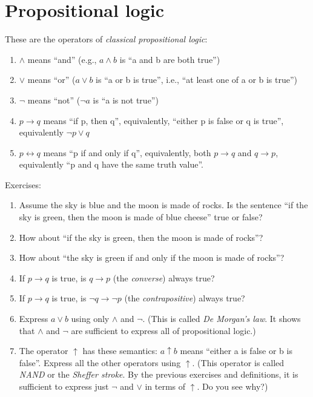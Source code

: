 \documentclass[letterpaper,12pt]{article}
\renewcommand{\implies}{\rightarrow}
\begin{document}
\section{Propositional logic}
These are the operators of \emph{classical propositional logic}:
\begin{enumerate}
\item
$\land$ means ``and'' (e.g., $a \land b$ is ``a and b are both true'')
\item
$\lor$ means ``or'' ($a \lor b$ is ``a or b is true'', i.e., ``at least one of a or b is true'')
\item
$\neg$ means ``not'' ($\neg a$ is ``a is not true'')
\item
$p \implies q$ means ``if p, then q'', equivalently, ``either p is false or q is true'', equivalently $\neg p \lor q$
\item
$p \leftrightarrow q$ means ``p if and only if q'', equivalently, both $p \implies q$ and $q \implies p$, equivalently ``p and q have the same truth value''.
\end{enumerate}

Exercises:
\begin{enumerate}
\item
Assume the sky is blue and the moon is made of rocks. Is the sentence ``if the sky is green, then the moon is made of blue cheese'' true or false?
\item
How about ``if the sky is green, then the moon is made of rocks''?
\item
How about ``the sky is green if and only if the moon is made of rocks''?
\item
If $p \implies q$ is true, is $q \implies p$ (the \emph{converse}) always true?
\item
If $p \implies q$ is true, is $\neg q \implies \neg p$ (the \emph{contrapositive}) always true?
\item
Express $a \lor b$ using only $\land$ and $\neg$. (This is called \emph{De Morgan's law}. It shows that $\land$ and $\neg$ are sufficient to express all of propositional logic.)
\item
The operator $\uparrow$ has these semantics: $a \uparrow b$ means ``either a is false or b is false''. Express all the other operators using $\uparrow$. (This operator is called \emph{NAND} or the \emph{Sheffer stroke}. By the previous exercises and definitions, it is sufficient to express just $\neg$ and $\lor$ in terms of $\uparrow$. Do you see why?)
\end{enumerate}
\end{document}
